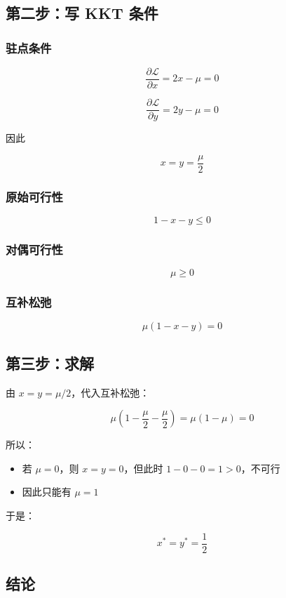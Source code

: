 \subsection{第二步：写 KKT 条件}

\subsubsection{驻点条件}

\[
\frac{\partial \mathcal{L}}{\partial x}=2x-\mu=0
\]

\[
\frac{\partial \mathcal{L}}{\partial y}=2y-\mu=0
\]

因此

\[
x=y=\frac{\mu}{2}
\]

\subsubsection{原始可行性}

\[
1-x-y\le 0
\]

\subsubsection{对偶可行性}

\[
\mu\ge 0
\]

\subsubsection{互补松弛}

\[
\mu(1-x-y)=0
\]

\subsection{第三步：求解}

由 \(x=y=\mu/2\)，代入互补松弛：

\[
\mu\left(1-\frac{\mu}{2}-\frac{\mu}{2}\right)=\mu(1-\mu)=0
\]

所以：

\begin{itemize}
  \item 若 \(\mu=0\)，则 \(x=y=0\)，但此时 \(1-0-0=1>0\)，不可行
  \item 因此只能有 \(\mu=1\)
\end{itemize}

于是：

\[
x^*=y^*=\frac12
\]

\subsection{结论}

